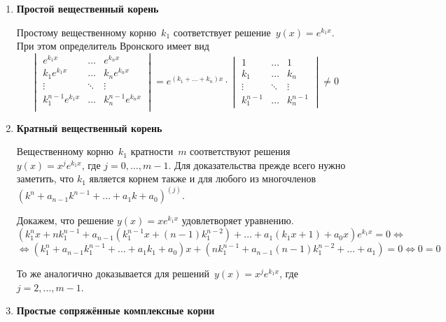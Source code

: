 \begin{enumerate}
	\item \textbf{Простой вещественный корень}
	
	Простому вещественному корню~$k_1$ соответствует решение~$y(x) = e^{k_1 x}$.
	При этом определитель Вронского имеет вид
	\begin{equation*}
	\begin{vmatrix}
	e^{k_1 x} & \ldots & e^{k_n x} \\
	k_1 e^{k_1 x} & \ldots & k_n e^{k_n x} \\
	\vdots & \ddots & \vdots \\
	k_1^{n-1} e^{k_1 x} & \ldots & k_n^{n-1} e^{k_n x} \\
	\end{vmatrix}
	= e^{(k_1 + \ldots + k_n) x} \cdot
	\begin{vmatrix}
	1 & \ldots & 1 \\
	k_1 & \ldots & k_n \\
	\vdots & \ddots & \vdots \\
	k_1^{n-1} & \ldots & k_n^{n-1}
	\end{vmatrix} \neq 0
	\end{equation*}
	
	\item \textbf{Кратный вещественный корень}
	
	Вещественному корню~$k_1$ кратности~$m$ соответствуют решения~$y(x) = x^j e^{k_1 x}$, где $j = 0, \ldots, m - 1$.
	Для доказательства прежде всего нужно заметить, что $k_1$ является корнем также и для любого из многочленов~$(k^n + a_{n-1} k^{n-1} + \ldots + a_1 k + a_0)^{(j)}$.
	
	Докажем, что решение $y(x) = x e^{k_1 x}$ удовлетворяет уравнению.
	\begin{equation*}
	(k_1^n x + n k_1^{n-1} + a_{n-1} (k_1^{n-1} x + (n - 1) k_1^{n-2}) + \ldots + a_1 (k_1 x + 1) + a_0 x) e^{k_1 x} = 0 \Leftrightarrow
	\end{equation*}
	\begin{equation*}
	\Leftrightarrow (k_1^n + a_{n-1} k_1^{n-1} + \ldots + a_1 k_1 + a_0) x + (n k_1^{n-1} + a_{n-1} (n - 1) k_1^{n-2} + \ldots + a_1) = 0 \Leftrightarrow
	0 = 0
	\end{equation*}
	
	То же аналогично доказывается для решений~$y(x) = x^j e^{k_1 x}$, где $j = 2, \ldots, m - 1$.
	
	\item \textbf{Простые сопряжённые комплексные корни}
	

\end{enumerate}
